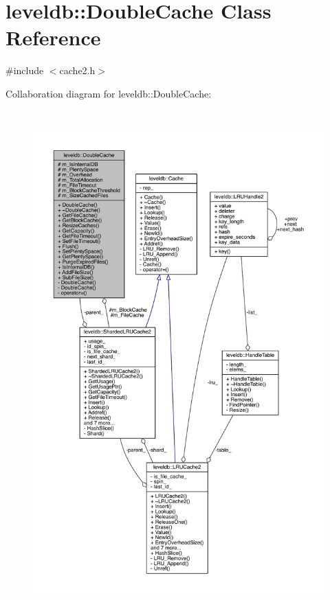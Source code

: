 \hypertarget{classleveldb_1_1_double_cache}{}\section{leveldb\+:\+:Double\+Cache Class Reference}
\label{classleveldb_1_1_double_cache}


{\ttfamily \#include $<$cache2.\+h$>$}



Collaboration diagram for leveldb\+:\+:Double\+Cache\+:
\nopagebreak
\begin{figure}[H]
\begin{center}
\leavevmode
\includegraphics[height=550pt]{classleveldb_1_1_double_cache__coll__graph}
\end{center}
\end{figure}
